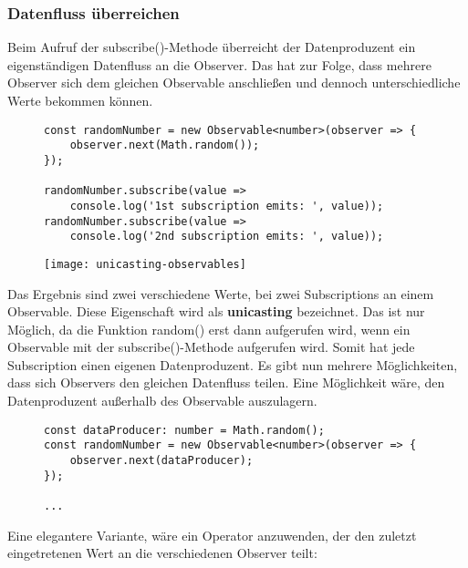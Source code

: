 \subsubsection{Datenfluss überreichen}

Beim Aufruf der subscribe()-Methode überreicht der Datenproduzent ein eigenständigen Datenfluss an die Observer. Das hat zur Folge, dass mehrere Observer sich dem gleichen Observable anschließen und dennoch unterschiedliche Werte bekommen können.

\begin{figure}[H]
\begin{lstlisting}[basicstyle=\small]
const randomNumber = new Observable<number>(observer => {
    observer.next(Math.random());
});

randomNumber.subscribe(value =>
    console.log('1st subscription emits: ', value));
randomNumber.subscribe(value =>
    console.log('2nd subscription emits: ', value));
\end{lstlisting}
\end{figure}

\begin{figure}[H]
\begin{center}
\texttt{[image: unicasting-observables]}
\end{center}
\end{figure}

\noindent
Das Ergebnis sind zwei verschiedene Werte, bei zwei Subscriptions an einem Observable. Diese Eigenschaft wird als \textbf{unicasting} bezeichnet. Das ist nur Möglich, da die Funktion random() erst dann aufgerufen wird, wenn ein Observable mit der subscribe()-Methode aufgerufen wird. Somit hat jede Subscription einen eigenen Datenproduzent. Es gibt nun mehrere Möglichkeiten, dass sich Observers den gleichen Datenfluss teilen. Eine Möglichkeit wäre, den Datenproduzent außerhalb des Observable auszulagern. 

\begin{figure}[H]
\begin{lstlisting}[basicstyle=\small]
const dataProducer: number = Math.random();
const randomNumber = new Observable<number>(observer => {
    observer.next(dataProducer);
});

...
\end{lstlisting}
\end{figure}

\noindent
Eine elegantere Variante, wäre ein Operator anzuwenden, der den zuletzt eingetretenen Wert an die verschiedenen Observer teilt:

